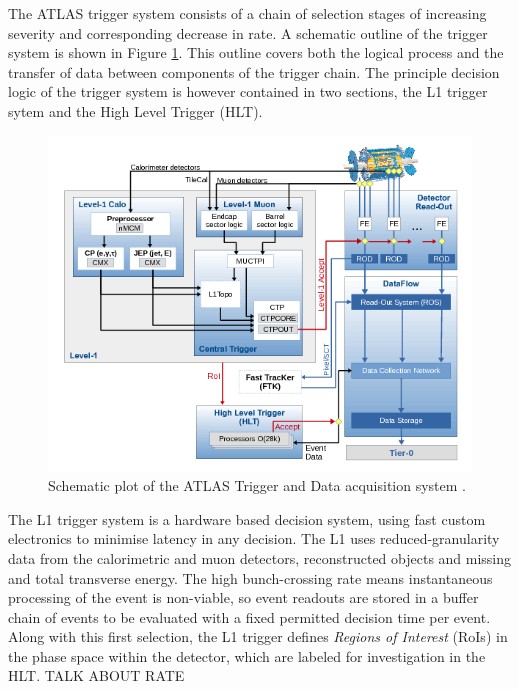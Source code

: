 	The ATLAS trigger system consists of a chain of selection stages of increasing severity and corresponding decrease in rate. A schematic outline of the trigger system is shown in Figure \ref{fig:trigschem}. This outline covers both the logical process and the transfer of data between components of the trigger chain. The principle decision logic of the trigger system is however contained in two sections, the L1 trigger sytem and the High Level Trigger (HLT).

	\begin{figure}
		\centering
		\includegraphics[width=0.7\linewidth]{D/FIGS/trigschem}
		\caption{Schematic plot of the ATLAS Trigger and Data acquisition system \cite{trig2015}.}
		\label{fig:trigschem}
		\end{figure}

	The L1 trigger system \cite{L1} is a hardware based decision system, using fast custom electronics to minimise latency in any decision. The L1 uses reduced-granularity data from the calorimetric and muon detectors, reconstructed objects and missing and total transverse energy. The high bunch-crossing rate means instantaneous processing of the event is non-viable, so event readouts are stored in a buffer chain of events to be evaluated with a fixed permitted decision time per event. Along with this first selection, the L1 trigger defines \textit{Regions of Interest} (RoIs) in the phase space within the detector, which are labeled for investigation in the HLT. TALK ABOUT RATE

